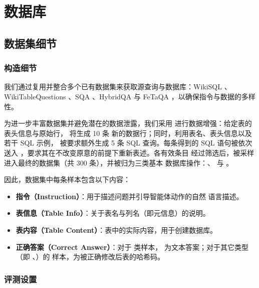 
\section{数据库}\label{app:db}

\subsection{数据集细节}

\subsubsection*{构造细节}

我们通过复用并整合多个已有数据集来获取源查询与数据库：WikiSQL
\citep{zhong2017}、WikiTableQuestions \citep{pasupat2015}、SQA
\citep{iyyer2017}、HybridQA \citep{chen2020hybridqa} 与 FeTaQA
\citep{nan2021fetaqa}，以确保指令与数据的多样性。

为进一步丰富数据集并避免潜在的数据泄露，我们采用 
进行数据增强：给定表的表头信息与原始行， 将生成 10 条
新的数据行；同时，利用表名、表头信息以及若干 SQL 示例，
被要求额外生成 5 条 SQL 查询。每条得到的 SQL 语句被依次送入
，要求其在不改变原意的前提下重新表述。各有效条目
经过筛选后，被采样进入最终的数据集（共 300 条），并被归为三类基本
数据库操作：、 与 。

因此，数据集中每条样本包含以下内容：
\begin{itemize}
    \item \textbf{指令（Instruction）}：用于描述问题并引导智能体动作的自然
          语言描述。
    \item \textbf{表信息（Table Info）}：关于表名与列名（即元信息）的说明。
    \item \textbf{表内容（Table Content）}：表中的实际内容，用于创建数据库。
    \item \textbf{正确答案（Correct Answer）}：对于  类样本，
          为文本答案；对于其它类型（即 、）的
          样本，为被正确修改后表的哈希码。
\end{itemize}

\subsubsection*{评测设置}

